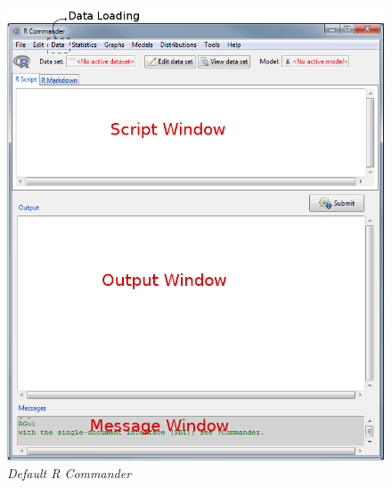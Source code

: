 \documentclass[a4paper]{article}\usepackage[]{graphicx}\usepackage[]{color}
\begin{document}
\begin{figure}[H]
\centering
\includegraphics[scale=0.4]{figures/rcmdrwindow.png}
\caption{{\it Default R Commander}\label{rcmdrwindow}}
\end{figure}



\end{document}
